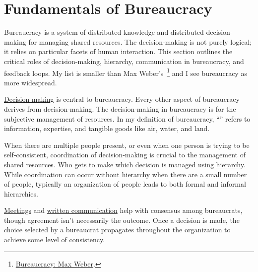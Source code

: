 \section{Fundamentals of Bureaucracy\label{sec:fundamentals-of-b}}
  
Bureaucracy is a system of distributed knowledge and distributed decision-making for managing shared resources. The decision-making is not purely logical; it relies on particular facets of human interaction. This section outlines the critical roles of decision-making, hierarchy, communication in bureaucracy, and feedback loops. 
My list is smaller than Max Weber's~\cite{2015_Weber}\footnote{\href{https://en.wikipedia.org/wiki/Bureaucracy\%23Max_Weber}{Bureaucracy: Max Weber}.
} and I see bureaucracy as more widespread.

\hyperref[sec:decision-making]{Decision-making}
is central to bureaucracy. Every other aspect of bureaucracy derives from decision-making. The decision-making in bureaucracy is for the subjective management of resources. In my definition of bureaucracy, ``\iftoggle{glossarysubstitutionworks}{\glspl{shared resource}}{shared resources}'' 
\iftoggle{glossaryinmargin}{\marginpar{[Glossary]}}{} refers to information, expertise, and tangible goods like air, water, and land. 

When there are multiple people present, or even when one person is trying to be self-consistent, coordination of decision-making is crucial to the management of shared resources. Who gets to make which decision is managed using
\hyperref[sec:hierarchy-of-roles]{hierarchy}.
While coordination can occur without hierarchy when there are a small number of people, typically an organization of people leads to both formal and informal hierarchies. 

\hyperref[sec:meetings-for-coordination]{Meetings} and 
\hyperref[sec:written-communication]{written communication} help with consensus among bureaucrats, though agreement isn't necessarily the outcome.
Once a decision is made, the choice selected by a bureaucrat propagates throughout the organization to achieve some level of consistency. 

